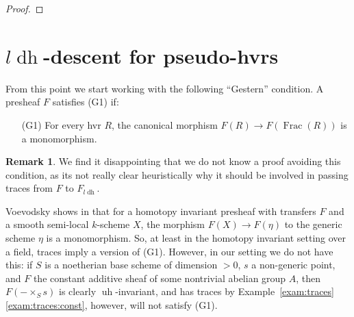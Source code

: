 \documentclass[10pt]{amsart}
\theoremstyle{definition}
\newtheorem{rema}[theo]{Remark}
\DeclareMathOperator{\Spec}{Spec}
\DeclareMathOperator{\Frac}{Frac}
\newcommand{\fpsl}{{\operatorname{fps\!}l'}}
\newcommand{\ldh}{{l{\operatorname{dh}}}}
\newcommand{\uh}{\operatorname{uh}}
\newcommand{\cduh}{\operatorname{cduh}}
\begin{document}
\begin{proof}
\end{proof}

\section{$\ldh$-descent for pseudo-hvrs} \label{sec:hvrldh}

From this point we start working with the following ``Gestern'' condition. A presheaf $F$ satisfies (G1) if:
\begin{enumerate}
 \item[(G1)] For every hvr $R$, the canonical morphism $F(R) \to F(\Frac(R))$ is a monomorphism.
\end{enumerate}

\begin{rema} \label{rema:whyGersten}
We find it disappointing that we do not know a proof avoiding this condition, as its not really clear heuristically why it should be involved in passing traces from $F$ to $F_\ldh$.

Voevodsky shows in \cite[Cor.4.18]{Voe00b} that for a homotopy invariant presheaf with transfers $F$ and a smooth semi-local $k$-scheme $X$, the morphism $F(X) \to F(\eta)$ to the generic scheme $\eta$ is a monomorphism. So, at least in the homotopy invariant setting over a field, traces imply a version of (G1). However, in our setting we do not have this: if $S$ is a noetherian base scheme of dimension $> 0$, $s$ a non-generic point, and $F$ the constant additive sheaf of some nontrivial abelian group $A$, then $F(-\times_S s)$ is clearly $\uh$-invariant, and has traces by Example~\ref{exam:traces}\eqref{exam:traces:const}, however, will not satisfy (G1).
\end{rema}
\end{document}
